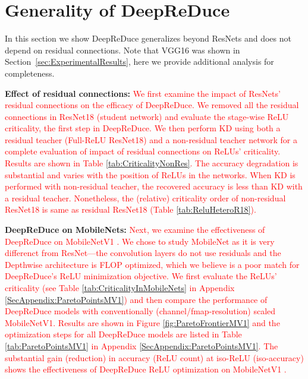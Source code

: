 \section{Generality of DeepReDuce} \label{sec:Generality}
In this section we show DeepReDuce generalizes beyond ResNets and does not depend on residual connections.
Note that VGG16 was shown in Section~\ref{sec:ExperimentalResults},
here we provide additional analysis for completeness.

{\bf Effect of residual connections:} \textcolor{red}{
We first examine the impact of ResNets' residual connections 
on the efficacy of DeepReDuce. 
We removed all the residual connections in ResNet18 (student network) and evaluate the stage-wise ReLU criticality, the first step in DeepReDuce. 
We then perform KD using both a residual teacher (Full-ReLU ResNet18) and a non-residual teacher network for a complete evaluation of impact of residual connections on ReLUs' criticality. 
Results are shown in Table \ref{tab:CriticalityNonRes}.} 
\textcolor{red}{
The accuracy degradation is substantial and varies with the position of ReLUs in the networks. 
When KD is performed with non-residual teacher, the recovered accuracy is less than KD with a residual teacher. 
Nonetheless, the (relative) criticality order of non-residual ResNet18 is same as residual ResNet18  (Table \ref{tab:ReluHeteroR18}). } 






{\bf DeepReDuce on MobileNets:} 
\textcolor{red}{Next, we examine the effectiveness of DeepReDuce on MobileNetV1 \cite{howard2017mobilenets}.
We chose to study MobileNet as it is very differenct from ResNet---the convolution layers
do not use residuals and the Depthwise architecture is FLOP optimized, which we believe is a poor match for DeepReDuce's ReLU minimization objective.
We first evaluate the ReLUs' criticality (see Table \ref{tab:CriticalityInMobileNets} in Appendix \ref{SecAppendix:ParetoPointsMV1}) and then compare the performance of DeepReDuce models with conventionally (channel/fmap-resolution) scaled MobileNetV1. 
Results are shown in Figure \ref{fig:ParetoFrontierMV1} and the optimization steps for all DeepReDuce models are listed in Table \ref{tab:ParetoPointsMV1} in Appendix \ref{SecAppendix:ParetoPointsMV1}. 
The substantial gain (reduction) in accuracy (ReLU count) at iso-ReLU (iso-accuracy) shows the effectiveness of DeepReDuce ReLU optimization on MobileNetV1 .
 }

